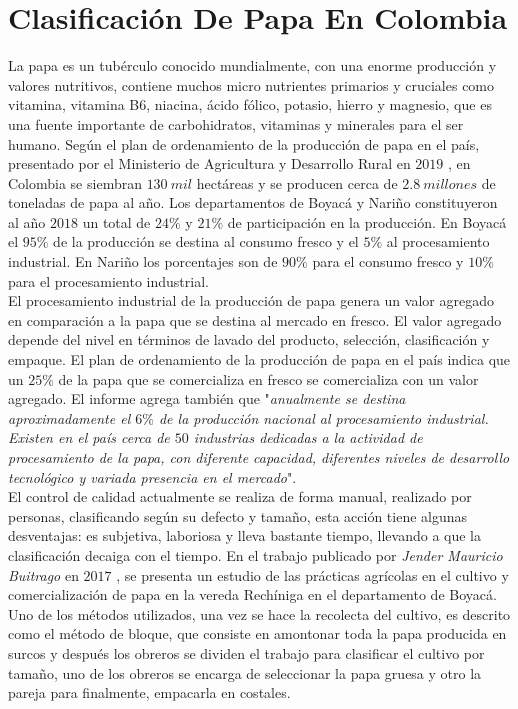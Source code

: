\section{Clasificación De Papa En Colombia}

La papa es un tubérculo conocido mundialmente, con una enorme producción y valores nutritivos, contiene muchos micro nutrientes primarios y cruciales como vitamina, vitamina B6, niacina, ácido fólico, potasio, hierro y magnesio, que es una fuente importante de carbohidratos, vitaminas y minerales para el ser humano. Según el plan de ordenamiento de la producción de papa en el país, presentado por el Ministerio de Agricultura y Desarrollo Rural en $2019$ \cite{informepapa2019}, en Colombia se siembran  $130 \ mil$ hectáreas y se producen cerca de  $2.8 \ millones$  de  toneladas  de  papa  al año. Los departamentos de Boyacá y Nariño constituyeron al año $2018$ un total de $24\%$ y $21\%$ de participación en la producción. En Boyacá el $95\%$ de la producción se destina al consumo fresco y el $5\%$ al procesamiento industrial. En Nariño los porcentajes son de $90\%$ para el consumo fresco y $10\%$ para el procesamiento industrial.\\

El procesamiento industrial de la producción de papa genera un valor agregado en comparación a la papa que se destina al mercado en fresco. El valor agregado depende del nivel en términos de lavado del producto, selección, clasificación y empaque. El plan de ordenamiento de la producción de papa en el país indica que un $25\%$ de la papa que se comercializa en fresco se comercializa con un valor agregado. El informe agrega también que "\textit{anualmente se  destina  aproximadamente  el  $6\%$  de  la  producción  nacional  al procesamiento industrial.  Existen en el país cerca de $50$ industrias dedicadas a la actividad de procesamiento de la papa, con diferente capacidad, diferentes niveles de desarrollo tecnológico y variada presencia en el mercado}".\\


El control de calidad actualmente se realiza de forma manual, realizado por personas, clasificando según su defecto y tamaño, esta acción tiene algunas desventajas: es subjetiva, laboriosa y lleva bastante tiempo, llevando a que la clasificación decaiga con el tiempo. En el trabajo publicado por \textit{Jender Mauricio Buitrago} en $2017$ \cite{recoleccionpapa}, se presenta un estudio de las prácticas agrícolas en el cultivo y comercialización de papa en la vereda Rechíniga en el departamento de Boyacá. Uno de los métodos utilizados, una vez se hace la recolecta del cultivo, es descrito como el método de bloque, que consiste en amontonar toda la papa producida en surcos y después los obreros se dividen el trabajo para clasificar el cultivo por tamaño, uno de los obreros se encarga de seleccionar la papa gruesa y otro la pareja para finalmente, empacarla en costales.\\

